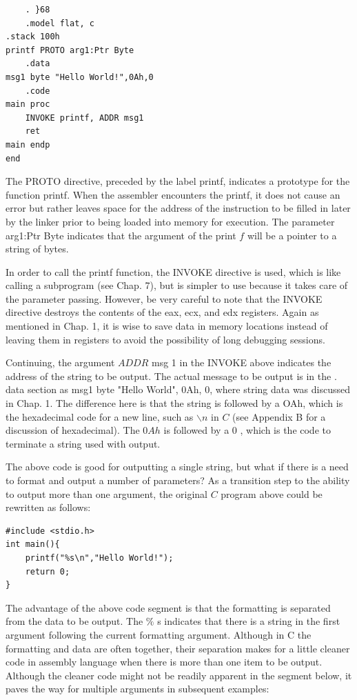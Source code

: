 \documentclass[10pt]{book}
\begin{document}
\begin{verbatim}
    . }68
    .model flat, c
.stack 100h
printf PROTO arg1:Ptr Byte
    .data
msg1 byte "Hello World!",0Ah,0
    .code
main proc
    INVOKE printf, ADDR msg1
    ret
main endp
end
\end{verbatim}

The PROTO directive, preceded by the label printf, indicates a prototype for the function printf. When the assembler encounters the printf, it does not cause an error but rather leaves space for the address of the instruction to be filled in later by the linker prior to being loaded into memory for execution. The parameter arg1:Ptr Byte indicates that the argument of the print $f$ will be a pointer to a string of bytes.

In order to call the printf function, the INVOKE directive is used, which is like calling a subprogram (see Chap. 7), but is simpler to use because it takes care of the parameter passing. However, be very careful to note that the INVOKE directive destroys the contents of the eax, ecx, and edx registers. Again as mentioned in Chap. 1, it is wise to save data in memory locations instead of leaving them in registers to avoid the possibility of long debugging sessions.

Continuing, the argument $A D D R$ msg 1 in the INVOKE above indicates the address of the string to be output. The actual message to be output is in the . data section as msg1 byte "Hello World", 0Ah, 0, where string data was discussed in Chap. 1. The difference here is that the string is followed by a OAh, which is the hexadecimal code for a new line, such as $\backslash n$ in $C$ (see Appendix B for a discussion of hexadecimal). The $0 A h$ is followed by a 0 , which is the code to terminate a string used with output.

The above code is good for outputting a single string, but what if there is a need to format and output a number of parameters? As a transition step to the ability to output more than one argument, the original $C$ program above could be rewritten as follows:

\begin{verbatim}
#include <stdio.h>
int main(){
    printf("%s\n","Hello World!");
    return 0;
}
\end{verbatim}

The advantage of the above code segment is that the formatting is separated from the data to be output. The $\%$ s indicates that there is a string in the first argument following the current formatting argument. Although in C the formatting and data are often together, their separation makes for a little cleaner code in assembly language when there is more than one item to be output. Although the cleaner code might not be readily apparent in the segment below, it paves the way for multiple arguments in subsequent examples:
\end{document}
